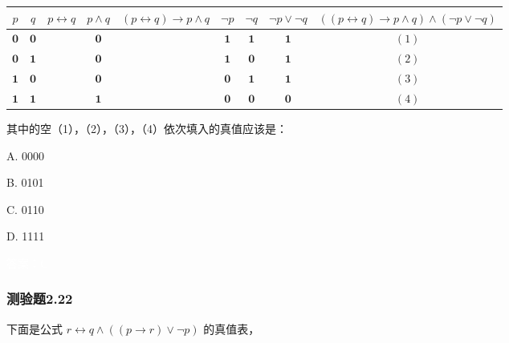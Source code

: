 \documentclass[UTF8, heading=true]{ctexart}
\begin{document}
\clearpage

\begin{table}[H]
  \centering
  \renewcommand{\arraystretch}{1.2}
\begin{tabular}{c|c|c|c|c|c|c|c|c}
\hline$p$ & $q$ & $p \leftrightarrow q$ & $p \wedge q$ & $(p \leftrightarrow q) \rightarrow p \wedge q$ & $\neg p$ & $\neg q$ & $\neg p \vee \neg q$ & $((p \leftrightarrow q) \rightarrow p \wedge q) \wedge(\neg p \vee \neg q)$ \\
\hline $\mathbf{0}$ & $\mathbf{0}$ & & $\mathbf{0}$ & & $\mathbf{1}$ & $\mathbf{1}$ & $\mathbf{1}$ & ${(1)}$ \\
\hline $\mathbf{0}$ & $\mathbf{1}$ & & $\mathbf{0}$ & & $\mathbf{1}$ & $\mathbf{0}$ & $\mathbf{1}$ & $(2)$ \\
\hline $\mathbf{1}$ & $\mathbf{0}$ & & $\mathbf{0}$ & & $\mathbf{0}$ & $\mathbf{1}$ & $\mathbf{1}$ & ${(3)}$ \\
\hline $\mathbf{1}$ & $\mathbf{1}$ & & $\mathbf{1}$ & & $\mathbf{0}$ & $\mathbf{0}$ & $\mathbf{0}$ & ${(4)}$ \\
\hline
\end{tabular}
\end{table}

其中的空（1），（2），（3），（4）依次填入的真值应该是： $\qquad$


A. 0000

B.  0101

C.  0110

D.   1111

\textcolor{white}{答案：C}

\subsubsection{测验题2.22}

下面是公式 $r \leftrightarrow q \wedge((p \rightarrow r) \vee \neg p)$ 的真值表，
\end{document}
